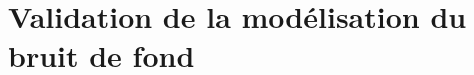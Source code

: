 \section{Validation de la modélisation du bruit de fond}\label{chapter-HTT_analysis-section-bg_estimation-subsec-validation}

%
